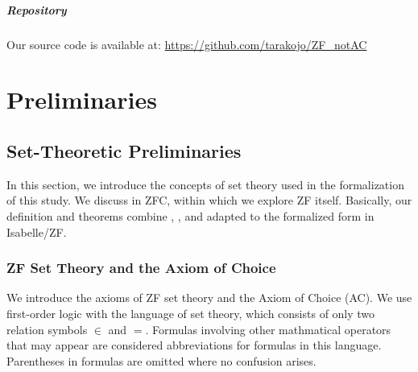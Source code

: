 \documentclass{report}
\begin{document}
\paragraph{Repository}
Our source code is available at: \url{https://github.com/tarakojo/ZF_notAC}




\chapter{Preliminaries}\label{chap:preliminaries}



\section{Set-Theoretic Preliminaries}
In this section, we introduce the concepts of set theory used in the formalization of this study.
We discuss in ZFC, within which we explore ZF itself. 
Basically, our definition and theorems combine \cite{kunen2011}, \cite{karagila}, and \cite{jech_AC}
adapted to the formalized form in Isabelle/ZF.


\subsection{ZF Set Theory and the Axiom of Choice}
We introduce the axioms of ZF set theory and the Axiom of Choice (AC).
We use first-order logic with the language of set theory, which consists of only two relation symbols $\in$ and $=$. 
Formulas involving other mathmatical operators that may appear are considered abbreviations for formulas in this language.
Parentheses in formulas are omitted where no confusion arises.
\end{document}
